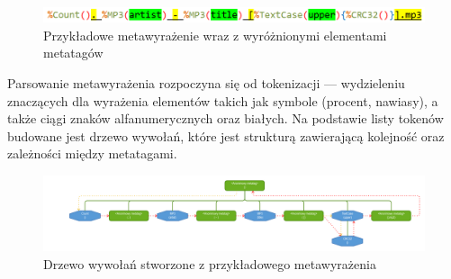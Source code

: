 \begin{figure}[h]
\begin{center}
\includegraphics[scale=0.55]{img/metatag_expr2.png}
\end{center}
\caption{Przykładowe metawyrażenie wraz z wyróżnionymi elementami metatagów}
\label{metatag-expr}
\end{figure}

\par
Parsowanie metawyrażenia rozpoczyna się od tokenizacji --- wydzieleniu znaczących dla wyrażenia elementów takich jak symbole (procent, nawiasy), a także ciągi znaków alfanumerycznych oraz białych. Na podstawie listy tokenów budowane jest drzewo wywołań, które jest strukturą zawierającą kolejność oraz zależności między metatagami.

\begin{figure}
\begin{center}
\includegraphics[scale=0.55]{img/metatag_expr_tree4.png}
\end{center}
\caption{Drzewo wywołań stworzone z przykładowego metawyrażenia}
\label{metatag-expr-tree}
\end{figure}

